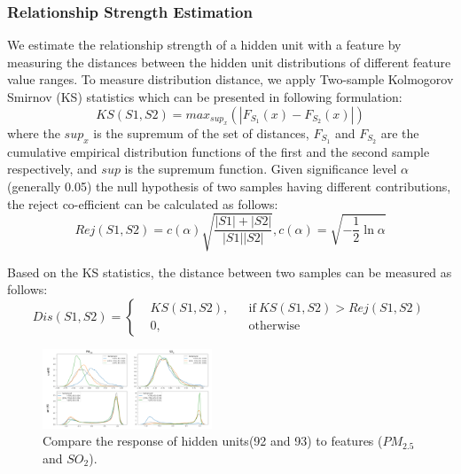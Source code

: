 \subsubsection{Relationship Strength Estimation}
\label{section:qualify_response}
We estimate the relationship strength of a hidden unit with a feature by measuring the distances between the hidden unit distributions of different feature value ranges.
To measure distribution distance, we apply Two-sample Kolmogorov Smirnov (KS) statistics which can be presented in following formulation:
\begin{equation} 
KS(S1, S2) = max_{sup_x}(|F_{S_1}(x) - F_{S_2}(x)|)
\end{equation}
where the $sup_x$ is the supremum of the set of distances, $F_{S_1}$ and $F_{S_2}$ are the cumulative empirical distribution functions of the first and the second sample respectively, and $sup$ is the supremum function.
Given significance level $\alpha$ (generally 0.05) the null hypothesis of two samples having different contributions, the reject co-efficient can be calculated as follows:
\begin{equation} 
Rej(S1, S2) = c(\alpha)\sqrt{\frac{|S1| + |S2|}{|S1||S2|}},  c(\alpha) = \sqrt{-\frac{1}{2}\ln\alpha }
\end{equation}

Based on the KS statistics, the distance between two samples can be measured as follows:
\begin{equation} 
Dis(S1, S2) = \left \{
  \begin{aligned}
    &KS(S1, S2), && \text{if}\ KS(S1, S2) > Rej(S1, S2)\\
    &0, && \text{otherwise}
  \end{aligned} \right.
\end{equation}

\begin{figure}[t]
	\centering
	\includegraphics[width=0.45\textwidth]{pictures/methods/unit_response_kdeplot.pdf}
	\vspace{-3mm}
	\caption{Compare the response of hidden units(92 and 93) to features ($PM_{2.5}$ and $SO_2$). 
	}
	\label{fig:unit_distribution_subgroup}
	\vspace{-4mm}
\end{figure}



